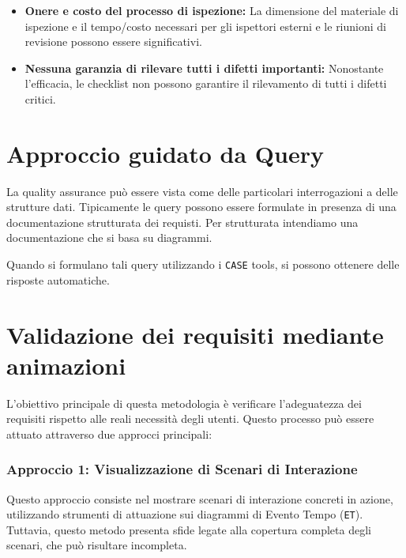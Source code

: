     \begin{tcolorbox}[colback=red!5!white,colframe=red!75!black,title=Limitazioni 
        delle Checklist]
    \begin{itemize}
      \item \textbf{Onere e costo del processo di ispezione:} La dimensione del 
      materiale di ispezione e il tempo/costo necessari per gli ispettori esterni 
      e le riunioni di revisione possono essere significativi.
      \item \textbf{Nessuna garanzia di rilevare tutti i difetti importanti:} Nonostante 
      l'efficacia, le checklist non possono garantire il rilevamento di tutti i 
      difetti critici.
    \end{itemize}
    \end{tcolorbox}
\section{Approccio guidato da Query}
La quality assurance può essere vista come delle particolari interrogazioni a 
delle strutture dati. Tipicamente le query possono essere formulate in presenza di una documentazione 
strutturata dei requisti. Per strutturata intendiamo una documentazione che
si basa su diagrammi.

Quando si formulano tali query utilizzando i \texttt{CASE} tools, si possono
ottenere delle risposte automatiche.
\section{Validazione dei requisiti mediante animazioni}
L'obiettivo principale di questa metodologia è verificare l'adeguatezza dei requisiti 
rispetto alle reali necessità degli utenti. Questo processo può essere attuato 
attraverso due approcci principali:

\subsubsection{Approccio 1: Visualizzazione di Scenari di Interazione}
Questo approccio consiste nel mostrare scenari di interazione concreti in azione, 
utilizzando strumenti di attuazione sui diagrammi di Evento Tempo (\texttt{ET}). Tuttavia, 
questo metodo presenta sfide legate alla copertura completa degli scenari, che 
può risultare incompleta.


